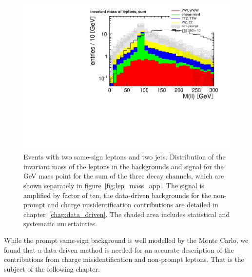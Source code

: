 \begin{figure}[htb]
    \centering
    \includegraphics[width=\textwidth]{images/pdf/same-sign,_2_jets/lep_mass_sum_0}
    \caption{Events with two same-sign leptons and two jets. Distribution of the invariant mass of the leptons in the backgrounds and
        signal for the \unit[550]{GeV} mass point for the sum of the three
        decay channels, which are shown separately in figure~\ref{fig:lep_mass_app}. The signal is
    amplified by factor of ten, the data-driven backgrounds for the
non-prompt and charge misidentification contributions are detailed in
chapter~\ref{chap:data_driven}. The shaded area includes statistical and
systematic uncertainties.}
    \label{fig:lep_mass}
\end{figure}
While the prompt same-sign background is well modelled by the Monte Carlo, we
found that a data-driven method is needed for an accurate description of the
contributions from charge misidentification and non-prompt leptons.
That is the subject of the following chapter.
